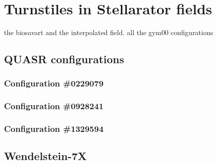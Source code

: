 

\chapter{Turnstiles in Stellarator fields}

the biosavart and the interpolated field. all the gym00 configurations

\section{QUASR configurations}

\subsection{Configuration \#0229079}



\subsection{Configuration \#0928241}



\subsection{Configuration \#1329594}



\section{Wendelstein-7X}

